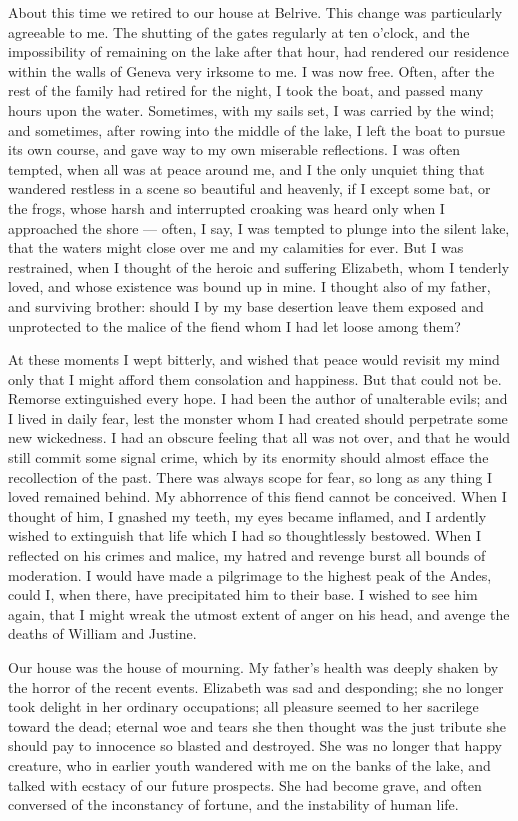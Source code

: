 About this time we retired to our house
at Belrive. This change was particularly
agreeable to me. The shutting of the
gates regularly at ten o'clock, and the
impossibility of remaining on the lake
after that hour, had rendered our
residence within the walls of Geneva
very irksome to me. I was now free.
Often, after the rest of the family had
retired for the night, I took the boat,
and passed many hours upon the water.
Sometimes, with my sails set, I was carried
by the wind; and sometimes, after
rowing into the middle of the lake, I
left the boat to pursue its own course,
and gave way to my own miserable reflections.
I was often tempted, when all
was at peace around me, and I the only
unquiet thing that wandered restless in
a scene so beautiful and heavenly, if
I except some bat, or the frogs, whose
harsh and interrupted croaking was
heard only when I approached the
shore --- often, I say, I was tempted to
plunge into the silent lake, that the
waters might close over me and my calamities
for ever. But I was restrained,
when I thought of the heroic and suffering
Elizabeth, whom I tenderly loved,
and whose existence was bound up in
mine. I thought also of my father,
and surviving brother: should I by my
base desertion leave them exposed and
unprotected to the malice of the fiend
whom I had let loose among them?

At these moments I wept bitterly,
and wished that peace would revisit my
mind only that I might afford them
consolation and happiness. But that
could not be. Remorse extinguished
every hope. I had been the author of unalterable
evils; and I lived in daily fear,
lest the monster whom I had created
should perpetrate some new wickedness.
I had an obscure feeling that all
was not over, and that he would still
commit some signal crime, which by
its enormity should almost efface the
recollection of the past. There was
always scope for fear, so long as any
thing I loved remained behind. My
abhorrence of this fiend cannot be conceived.
When I thought of him, I
gnashed my teeth, my eyes became inflamed,
and I ardently wished to extinguish
that life which I had so thoughtlessly
bestowed. When I reflected on
his crimes and malice, my hatred and
revenge burst all bounds of moderation.
I would have made a pilgrimage to the
highest peak of the Andes, could I, when
there, have precipitated him to their
base. I wished to see him again, that
I might wreak the utmost extent of
anger on his head, and avenge the
deaths of William and Justine.

Our house was the house of mourning.
My father's health was deeply
shaken by the horror of the recent
events. Elizabeth was sad and desponding;
she no longer took delight in her ordinary
occupations; all pleasure seemed
to her sacrilege toward the dead; eternal
woe and tears she then thought was
the just tribute she should pay to innocence
so blasted and destroyed. She
was no longer that happy creature, who
in earlier youth wandered with me on
the banks of the lake, and talked with
ecstacy of our future prospects. She
had become grave, and often conversed
of the inconstancy of fortune, and the
instability of human life.

